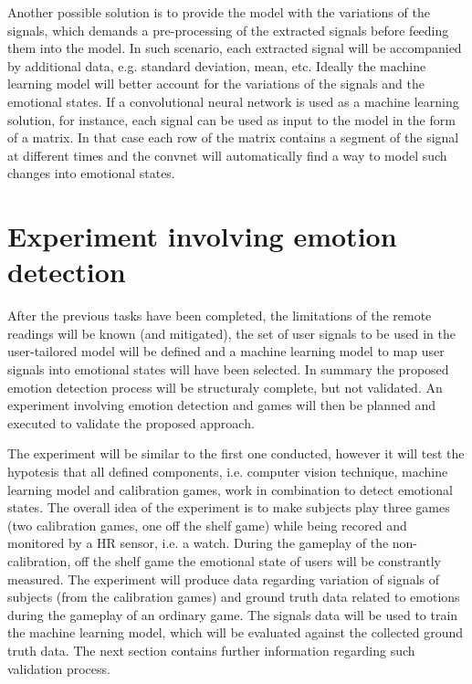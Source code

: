 Another possible solution is to provide the model with the variations of the signals, which demands a pre-processing of the extracted signals before feeding them into the model. In such scenario, each extracted signal will be accompanied by additional data, e.g. standard deviation, mean, etc. Ideally the machine learning model will better account for the variations of the signals and the emotional states. If a convolutional neural network is used as a machine learning solution, for instance, each signal can be used as input to the model in the form of a matrix. In that case each row of the matrix contains a segment of the signal at different times and the convnet will automatically find a way to model such changes into emotional states.

\section{Experiment involving emotion detection}
\label{closing:emotion-detection-experiment}

After the previous tasks have been completed, the limitations of the remote readings will be known (and mitigated), the set of user signals to be used in the user-tailored model will be defined and a machine learning model to map user signals into emotional states will have been selected. In summary the proposed emotion detection process will be structuraly complete, but not validated. An experiment involving emotion detection and games will then be planned and executed to validate the proposed approach.

The experiment will be similar to the first one conducted, however it will test the hypotesis that all defined components, i.e. computer vision technique, machine learning model and calibration games, work in combination to detect emotional states. The overall idea of the experiment is to make subjects play three games (two calibration games, one off the shelf game) while being recored and monitored by a HR sensor, i.e. a watch. During the gameplay of the non-calibration, off the shelf game the emotional state of users will be constrantly measured. The experiment will produce data regarding variation of signals of subjects (from the calibration games) and ground truth data related to emotions during the gameplay of an ordinary game. The signals data will be used to train the machine learning model, which will be evaluated against the collected ground truth data. The next section contains further information regarding such validation process.

